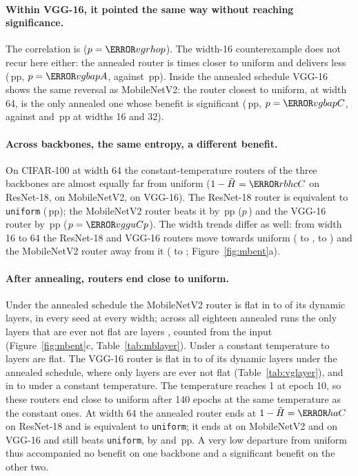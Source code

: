 \documentclass[10pt,a4paper]{article}
\begin{document}
\paragraph{Within VGG-16, it pointed the same way without reaching
significance.} The correlation is  ($p=\V{vgrhop}$). The width-16
counterexample does not recur here either: the annealed router is
 times closer to uniform and delivers less (\,pp,
$p=\V{vgbapA}$, against \,pp). Inside the annealed schedule
VGG-16 shows the same reversal as MobileNetV2: the router closest to
uniform, at width 64, is the only annealed one whose benefit is
significant (\,pp, $p=\V{vgbapC}$, against  and
\,pp at widths 16 and 32).

\paragraph{Across backbones, the same entropy, a different benefit.} On
CIFAR-100 at width 64 the constant-temperature routers of the three
backbones are almost equally far from uniform ($1-\tilde H=\V{rbhcC}$ on
ResNet-18,  on MobileNetV2,  on VGG-16). The ResNet-18
router is equivalent to \texttt{uniform} (\,pp); the MobileNetV2
router beats it by \,pp ($p$\,) and the VGG-16 router
by \,pp ($p=\V{vgguCp}$). The width trends differ as well: from
width 16 to 64 the ResNet-18 and VGG-16 routers move towards uniform
( to ,  to ) and the MobileNetV2 router
away from it ( to ; Figure~\ref{fig:mbent}a).

\paragraph{After annealing, routers end close to uniform.} Under the
annealed schedule the MobileNetV2 router is flat in  to
 of its  dynamic layers, in every seed at every
width; across all eighteen annealed runs the only layers that are ever not
flat are layers , counted from the input
(Figure~\ref{fig:mbent}c, Table~\ref{tab:mblayer}). Under a constant
temperature  to  layers are flat. The VGG-16
router is flat in  to  of its 
dynamic layers under the annealed schedule, where only layers
 are ever not flat (Table~\ref{tab:vglayer}), and in
 to  under a constant temperature. The
temperature reaches 1 at epoch 10, so these routers end close to uniform
after 140 epochs at the same temperature as the constant ones. At width
64 the annealed router ends at $1-\tilde H=\V{haC}$ on ResNet-18 and is
equivalent to \texttt{uniform}; it ends at  on MobileNetV2 and
 on VGG-16 and still beats \texttt{uniform}, by  and
\,pp. A very low departure from uniform thus accompanied no
benefit on one backbone and a significant benefit on the other two.
\end{document}
